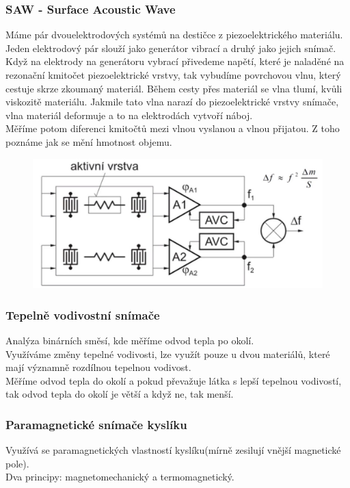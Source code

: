 \subsubsection*{SAW - Surface Acoustic Wave}
Máme pár dvouelektrodových systémů na destičce z piezoelektrického materiálu. Jeden elektrodový pár slouží jako generátor vibrací a druhý jako jejich snímač.\\
Když na elektrody na generátoru vybrací přivedeme napětí, které je naladěné na rezonační kmitočet piezoelektrické vrstvy, tak vybudíme povrchovou vlnu, který cestuje skrze zkoumaný materiál. Během cesty přes materiál se vlna tlumí, kvůli viskozitě materiálu. Jakmile tato vlna narazí do piezoelektrické vrstvy snímače, vlna materiál deformuje a to na elektrodách vytvoří náboj.\\
Měříme potom diferenci kmitočtů mezi vlnou vyslanou a vlnou přijatou. Z toho poznáme jak se mění hmotnost objemu.\\
\begin{figure}[h!]
    \centering
    \includegraphics[scale = 0.1]{img/ChemPiezoEl.png}
\end{figure}

\subsubsection{Tepelně vodivostní snímače}
Analýza binárních směsí, kde měříme odvod tepla po okolí.\\
Využíváme změny tepelné vodivosti, lze využít pouze u dvou materiálů, které mají významně rozdílnou tepelnou vodivost.\\
Měříme odvod tepla do okolí a pokud převažuje látka s lepší tepelnou vodivostí, tak odvod tepla do okolí je větší a když ne, tak menší.\\

\subsubsection{Paramagnetické snímače kyslíku}
Využívá se paramagnetických vlastností kyslíku(mírně zesilují vnější magnetické pole).\\
Dva principy: magnetomechanický a termomagnetický.\\
